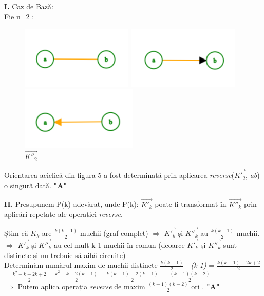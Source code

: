 \documentclass[12pt] {fphw}
\begin{document}
\begin{flushleft}
\textbf{I.} Caz de Bază: \\
Fie n=2 :

\begin{figure}[h] 
\begin{minipage}[c]{ .3\linewidth}
\includegraphics [height=3cm]{graph3.png}
\caption{${}K_2$}
\end{minipage}\hfill
\begin{minipage}[c]{.3\linewidth}
\includegraphics [height=3cm]{graph4.png}
\caption{$\vec{K'_2}$ }
\end{minipage}\hfill
\begin{minipage}[c]{ .3\linewidth}
\includegraphics [height=3cm]{graph5.png}
\caption {$\vec{K''_2}$}
\end{minipage}
\end{figure}

Orientarea aciclică din figura 5 a fost determinată prin aplicarea \textit{reverse}($\vec{K'_2}$, \textit{ab}) o singură dată.  \textbf{"A"} 
\end {flushleft}

\begin{flushleft}
\textbf{II.} Presupunem P(k) adevărat, unde P(k): {$\vec{K'_k}$} poate fi transformat în  {$\vec{K''_k}$} prin aplicări repetate ale operației \textit{reverse}. 

Știm că {$K_k$} are $\frac{k(k-1)}{2}$ muchii (graf complet) $\Longrightarrow$
{$\vec{K'_k}$} și {$\vec{K''_k}$} au $\frac{k(k-1)}{2}$ muchii.  \\
$\Longrightarrow$ {$\vec{K'_k}$} și {$\vec{K''_k}$} au cel mult k-1 muchii în comun (deoarce {$\vec{K'_k}$} și {$\vec{K''_k}$}  sunt distincte și nu trebuie să aibă circuite) \\
Determinăm numărul maxim de muchii distincte
$\frac{k(k-1)}{2}$ - \textit{(k-1)} = $\frac{k(k-1)- 2k+2}{2}$ = $\frac{k^2-k-2k+2}{2}$ =$\frac{k^2-k-2(k-1)}{2}$= $\frac{k(k-1)-2(k-1)}{2}$ = $\frac{(k-1)(k-2)}{2}$ \\
$\Longrightarrow$ Putem aplica operația \textit{reverse} de maxim $\frac{(k-1)(k-2)}{2}$ ori . \textbf{"A"} 
\end {flushleft}
\end{document}
